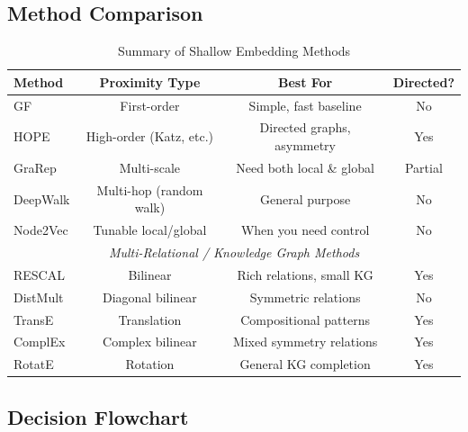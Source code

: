 \begin{notechapter}
\subsection{Method Comparison}

\begin{table}[htbp]
\centering
\caption{Summary of Shallow Embedding Methods}
\begin{tabular}{@{}lccc@{}}
\toprule
\textbf{Method} & \textbf{Proximity Type} & \textbf{Best For} & \textbf{Directed?} \\
\midrule
GF & First-order & Simple, fast baseline & No \\
HOPE & High-order (Katz, etc.) & Directed graphs, asymmetry & Yes \\
GraRep & Multi-scale & Need both local \& global & Partial \\
\midrule
DeepWalk & Multi-hop (random walk) & General purpose & No \\
Node2Vec & Tunable local/global & When you need control & No \\
\midrule
\multicolumn{4}{c}{\textit{Multi-Relational / Knowledge Graph Methods}} \\
\midrule
RESCAL & Bilinear & Rich relations, small KG & Yes \\
DistMult & Diagonal bilinear & Symmetric relations & No \\
TransE & Translation & Compositional patterns & Yes \\
ComplEx & Complex bilinear & Mixed symmetry relations & Yes \\
RotatE & Rotation & General KG completion & Yes \\
\bottomrule
\end{tabular}
\end{table}

\subsection{Decision Flowchart}

\begin{figure}[htbp]
\centering
{}
\end{figure}
\end{notechapter}
